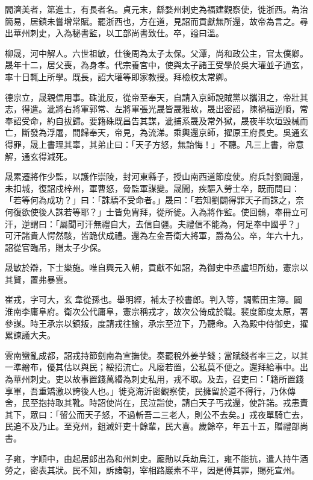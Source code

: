 \begin{pinyinscope}
 閻濟美者，第進士，有長者名。貞元末，繇婺州刺史為福建觀察使，徙浙西。為治簡易，居鎮未嘗增常賦。罷浙西也，方在道，見詔而貢獻無所還，故帝為言之。尋出華州刺史，入為秘書監，以工部尚書致仕。卒，謚曰溫。



 柳晟，河中解人。六世祖敏，仕後周為太子太保。父潭，尚和政公主，官太僕卿。晟年十二，居父喪，為身孝。代宗養宮中，使與太子諸王受學於吳大瓘並子通玄，率十日輒上所學。既長，詔大瓘等即家教授。拜檢校太常卿。



 德宗立，晟親信用事。硃泚反，從帝至奉天，自請入京師說賊黨以攜沮之，帝壯其志，得遣。泚將右將軍郭常、左將軍張光晟皆晟雅故，晟出密詔，陳禍福逆順，常奉詔受命，約自拔歸。要籍硃既昌告其謀，泚捕系晟及常外獄，晟夜半坎垣毀械而亡，斷發為浮屠，間歸奉天，帝見，為流涕。乘輿還京師，擢原王府長史。吳通玄得罪，晟上書理其辜，其弟止曰：「天子方怒，無詒悔！」不聽。凡三上書，帝意解，通玄得減死。



 晟累遷將作少監，以護作崇陵，封河東縣子，授山南西道節度使。府兵討劉闢還，未扣城，復詔戍梓州，軍曹怒，脅監軍謀變。晟聞，疾驅入勞士卒，既而問曰：「若等何為成功？」曰：「誅驕不受命者。」晟曰：「若知劉闢得罪天子而誅之，奈何復欲使後人誅若等耶？」士皆免胄拜，從所徙。入為將作監。使回鶻，奉冊立可汗，逆謂曰：「屬聞可汗無禮自大，去信自疆。夫禮信不能為，何足奉中國乎？」可汗諸貴人愕然駭，皆跪伏成禮。還為左金吾衛大將軍，爵為公。卒，年六十九，詔從官臨吊，贈太子少保。



 晟敏於辯，下士樂施。唯自興元入朝，貢獻不如詔，為御史中丞盧坦所劾，憲宗以其賢，置弗暴雲。



 崔戎，字可大，玄韋從孫也。舉明經，補太子校書郎。判入等，調藍田主簿。闢淮南李庸阜府。衛次公代庸阜，憲宗稱戎才，故次公倚成於職。裴度節度太原，署參謀。時王承宗以鎮叛，度請戎往諭，承宗至泣下，乃聽命。入為殿中侍御史，擢累諫議大夫。



 雲南蠻亂成都，詔戎持節劍南為宣撫使。奏罷稅外姜芋錢；當賦錢者率三之，以其一準繒布，優其估以與民；綏招流亡。凡廢若置，公私莫不便之。還拜給事中。出為華州刺史。吏以故事置錢萬緡為刺史私用，戎不取。及去，召吏曰：「籍所置錢享軍，吾重矯激以誇後人也。」徙兗海沂密觀察使，民擁留於道不得行，乃休傳舍，民至抱持取其靴。時詔使尚在，民泣詣使，請白天子丐戎還，使許諾。戎恚責其下，眾曰：「留公而天子怒，不過斬吾二三老人，則公不去矣。」戎夜單騎亡去，民追不及乃止。至兗州，鉏滅奸吏十餘輩，民大喜。歲餘卒，年五十五，贈禮部尚書。



 子雍，字順中，由起居郎出為和州刺史。龐勛以兵劫烏江，雍不能抗，遣人持牛酒勞之，密表其狀。民不知，訴諸朝，宰相路巖素不平，因是傅其罪，賜死宣州。



\end{pinyinscope}